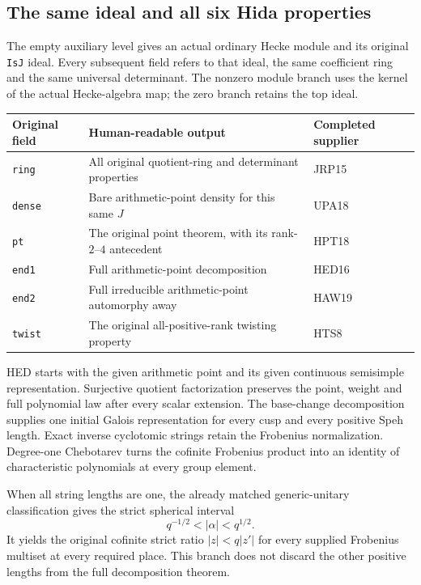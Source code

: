 \subsection{The same ideal and all six Hida properties}

The empty auxiliary level gives an actual ordinary Hecke module
and its original \texttt{Is\allowbreak J} ideal.  Every subsequent field refers
to that ideal, the same coefficient ring and the same universal
determinant.  The nonzero module branch uses the kernel of the
actual Hecke-algebra map; the zero branch retains the top ideal.

\begin{center}
\begin{tabular}{@{}p{}p{}p{}@{}}
\toprule
Original field & Human-readable output & Completed supplier\\
\midrule
\texttt{ring} & All original quotient-ring and determinant properties & JRP15\\
\texttt{dense} & Bare arithmetic-point density for this same $J$ & UPA18\\
\texttt{pt} & The original point theorem, with its rank-$2$--$4$ antecedent & HPT18\\
\texttt{end1} & Full arithmetic-point decomposition & HED16\\
\texttt{end2} & Full irreducible arithmetic-point automorphy away & HAW19\\
\texttt{twist} & The original all-positive-rank twisting property & HTS8\\
\bottomrule
\end{tabular}
\end{center}

HED starts with the given arithmetic point and its given continuous
semisimple representation.  Surjective quotient factorization
preserves the point, weight and full polynomial law after every
scalar extension.  The base-change decomposition supplies one
initial Galois representation for every cusp and every positive
Speh length.  Exact inverse cyclotomic strings retain the
Frobenius normalization.  Degree-one Chebotarev turns the cofinite
Frobenius product into an identity of characteristic polynomials
at every group element.

When all string lengths are one, the already matched
generic-unitary classification gives the strict spherical interval
\[
                   q^{-1/2}<|\alpha|<q^{1/2}.
\]
It yields the original cofinite strict ratio
$|z|<q|z'|$ for every supplied Frobenius multiset at every required
place.  This branch does not discard the other positive lengths
from the full decomposition theorem.

